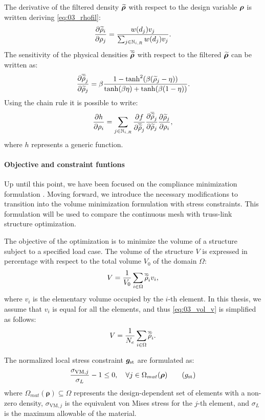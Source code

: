 The derivative of the filtered density $\bm{\widetilde{\rho}}$ with respect to the design variable $\bm{\rho}$ is written deriving \eqref{eq:03_rhofil}:
\begin{equation}
    \frac{\partial\widetilde{\rho}_i}{\partial\rho_j} = \frac{w(d_j)v_j}{\sum_{j \in \mathbb{N}_{i,R}} w(d_j)v_j}.
    \label{eq:03_sens_filt}
\end{equation}
The sensitivity of the physical densities $\bm{\overline{\widetilde{\rho}}}$ with respect to the filtered $\bm{\widetilde{\rho}}$ can be written as:
\begin{equation}
    \frac{\partial\overline{\widetilde{\rho}}_j}{\partial\widetilde{\rho}_j} = \beta \frac{1-\tanh^2(\beta(\widetilde{\rho}_j-\eta))}{\tanh(\beta\eta)+\tanh(\beta(1 - \eta))}.
    \label{eq:03_sens_proj}
\end{equation}
Using the chain rule it is possible to write:
\begin{equation}
    \label{eq:03_chain}
    \frac{\partial h}{\partial\rho_i} = \sum_{j \in \mathbb{N}_{i,R}} \frac{\partial f}{\partial\overline{\widetilde{\rho}}_j} \frac{\partial\overline{\widetilde{\rho}}_j}{\partial\widetilde{\rho}_j} \frac{\partial\widetilde{\rho}_j}{\partial\rho_i},
\end{equation}
where $h$ represents a generic function.
\paragraph{Objective and constraint funtions}
Up until this point, we have been focused on the compliance minimization formulation . Moving forward, we introduce the necessary modifications to transition into the volume minimization formulation with stress constraints. This formulation will be used to compare the continuous mesh with truss-link structure optimization.

The objective of the optimization is to minimize the volume of a structure subject to a specified load case. The volume of the structure $V$ is expressed in percentage with respect to the total volume $V_0$ of the domain $\Omega$:
\begin{equation}
    V = \frac{1}{V_0}\sum_{i \in \Omega} \overline{\widetilde{\rho}}_i v_i,
    \label{eq:03_vol_v}
\end{equation}
where $v_i$ is the elementary volume occupied by the $i$-th element. In this thesis, we assume that $v_i$ is equal for all the elements, and thus \eqref{eq:03_vol_v} is simplified as follows:
\begin{equation}
    V = \frac{1}{N_{e}} \sum_{i \in \Omega} \overline{\widetilde{\rho}}_i. 
    \label{eq:03_obj_vol}  
\end{equation}

The normalized local stress constraint $\bm{g}_{\text{st}}$ are formulated as:
\begin{equation}
    \frac{\sigma_{\text{VM},j}}{\sigma_L}-1 \leq 0, \quad \forall j \in \Omega_{mat}(\bm{\rho})
    \tag{$g_{\text{st}}$}
\end{equation}
where $\Omega_{mat}(\bm{\rho}) \subseteq \Omega$ represents the design-dependent set of elements with a non-zero density, $\sigma_{\text{VM},j}$ is the equivalent von Mises stress for the $j$-th element, and $\sigma_L$ is the maximum allowable of the material.

